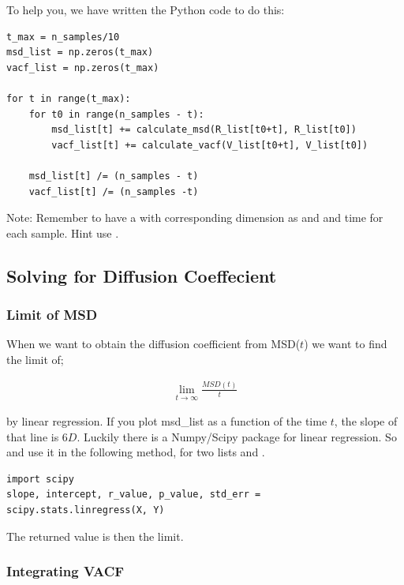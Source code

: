 \documentclass{article}
\begin{document}
To help you, we have written the Python code to do this:

\begin{lstlisting}
t_max = n_samples/10
msd_list = np.zeros(t_max)
vacf_list = np.zeros(t_max)

for t in range(t_max):
    for t0 in range(n_samples - t):
        msd_list[t] += calculate_msd(R_list[t0+t], R_list[t0])
        vacf_list[t] += calculate_vacf(V_list[t0+t], V_list[t0])

    msd_list[t] /= (n_samples - t)
    vacf_list[t] /= (n_samples -t)
\end{lstlisting}

Note: Remember to have a   with
corresponding dimension as  and 
and time for each sample.
Hint use
.

\subsection{Solving for Diffusion Coeffecient}

\subsubsection{Limit of MSD}

When we want to obtain the diffusion coefficient from MSD($t$) we
want to find the limit of;

\begin{align}
    \lim_{t\rightarrow \infty} \frac{MSD(t)}{t}
\end{align}

by linear regression. If you plot msd\_list as a function of the time $t$, the slope of that line is $6D$. 
Luckily there is a Numpy/Scipy package for linear regression.
So  and use it in the following method,
for two lists  and .\\

\begin{lstlisting}
import scipy
slope, intercept, r_value, p_value, std_err = scipy.stats.linregress(X, Y)
\end{lstlisting}

The returned value  is then the limit.


\subsubsection{Integrating VACF}
\end{document}
